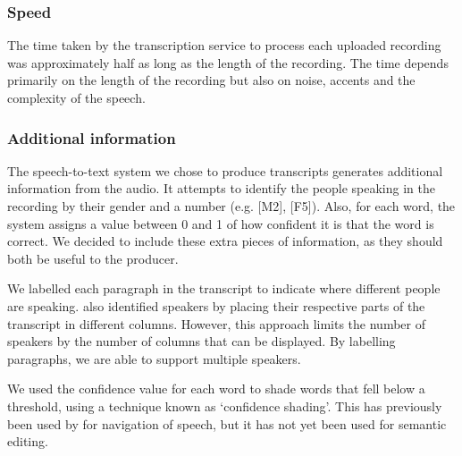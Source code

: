 \subsubsection{Speed}
The time taken by the transcription service to process each uploaded recording was approximately half as long as the
length of the recording. The time depends primarily on the length of the recording but also on noise, accents and the
complexity of the speech.

\subsubsection{Additional information}
The speech-to-text system we chose to produce transcripts generates additional information from the audio. It attempts
to identify the people speaking in the recording by their gender and a number (e.g. [M2], [F5]). Also, for each word,
the system assigns a value between 0 and 1 of how confident it is that the word is correct. We decided to include these
extra pieces of information, as they should both be useful to the producer.

We labelled each paragraph in the transcript to indicate where different people are speaking. \citet{Rubin2013} also
identified speakers by placing their respective parts of the transcript in different columns.  However, this approach
limits the number of speakers by the number of columns that can be displayed. By labelling paragraphs, we are able to
support multiple speakers.

We used the confidence value for each word to shade words that fell below a threshold, using a technique known as
`confidence shading'. This has previously been used by \citet{Burke2006} for navigation of speech, but it has not yet
been used for semantic editing.




